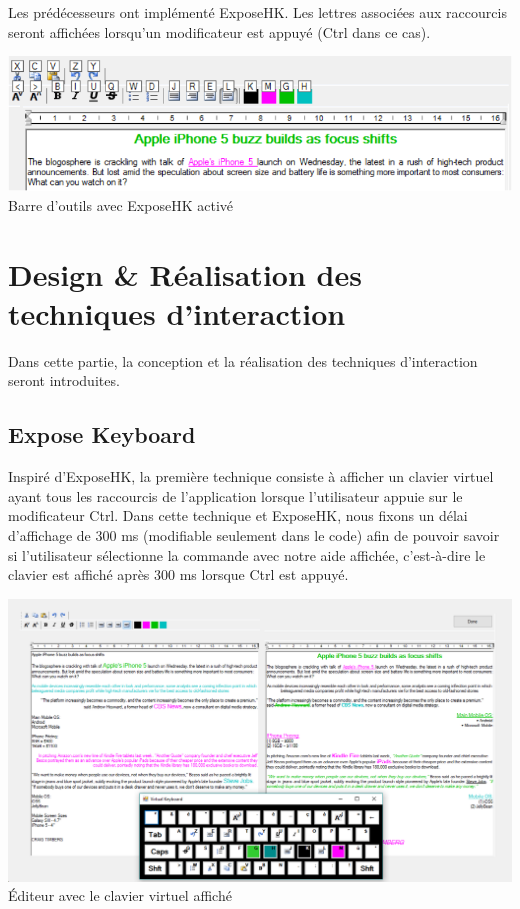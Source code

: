 \documentclass[12pt,a4paper]{article}
\begin{document}
Les prédécesseurs ont implémenté ExposeHK. Les lettres associées aux raccourcis seront affichées lorsqu'un modificateur est appuyé (Ctrl dans ce cas).
\begin{center}
	\includegraphics[width=1\linewidth]{HK.png}
	Barre d'outils avec ExposeHK activé
\end{center}
\section{Design \& Réalisation des techniques d'interaction}
Dans cette partie, la conception et la réalisation des techniques d'interaction seront introduites.
\subsection{Expose Keyboard}
Inspiré d'ExposeHK, la première technique consiste à afficher un clavier virtuel ayant tous les raccourcis de l'application lorsque l'utilisateur appuie sur le modificateur Ctrl. Dans cette technique et ExposeHK, nous fixons un délai d'affichage de 300 ms (modifiable seulement dans le code) afin de pouvoir savoir si l'utilisateur sélectionne la commande avec notre aide affichée, c'est-à-dire le clavier est affiché après 300 ms lorsque Ctrl est appuyé.
\begin{center}
	\includegraphics[width=1\linewidth]{ExposeKeyboard.png}
	Éditeur avec le clavier virtuel affiché
\end{center}
\end{document}
